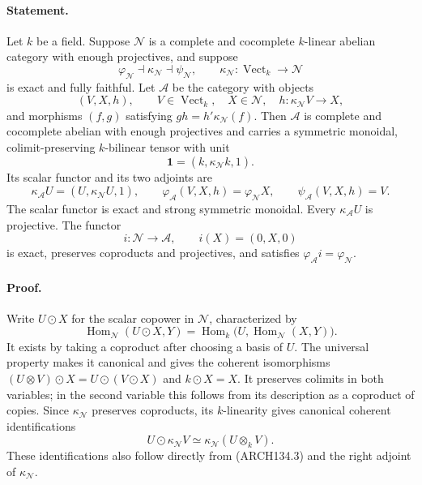 \paragraph{Statement.}
Let $k$ be a field.  Suppose $\mathcal N$ is a complete and cocomplete
$k$-linear abelian category with enough projectives, and suppose
\[
 \varphi_{\mathcal N}\dashv\kappa_{\mathcal N}\dashv\psi_{\mathcal N},
 \qquad \kappa_{\mathcal N}:\operatorname{Vect}_k\longrightarrow\mathcal N
\]
is exact and fully faithful.  Let $\mathcal A$ be the category with objects
\[
       (V,X,h),\qquad V\in\operatorname{Vect}_k,
       \quad X\in\mathcal N,\quad h:\kappa_{\mathcal N}V\longrightarrow X,
\]
and morphisms $(f,g)$ satisfying $gh=h'\kappa_{\mathcal N}(f)$.
Then $\mathcal A$ is complete and cocomplete abelian with enough
projectives and carries a symmetric monoidal, colimit-preserving
$k$-bilinear tensor with unit
\[
                  \mathbf1=(k,\kappa_{\mathcal N}k,1).
\]
Its scalar functor and its two adjoints are
\[
 \kappa_{\mathcal A}U=(U,\kappa_{\mathcal N}U,1),\qquad
 \varphi_{\mathcal A}(V,X,h)=\varphi_{\mathcal N}X,\qquad
 \psi_{\mathcal A}(V,X,h)=V.
 \tag{ARCH134.1}
\]
The scalar functor is exact and strong symmetric monoidal.  Every
$\kappa_{\mathcal A}U$ is projective.  The functor
\[
       i:\mathcal N\longrightarrow\mathcal A,
                    \qquad i(X)=(0,X,0)
 \tag{ARCH134.2}
\]
is exact, preserves coproducts and projectives, and satisfies
$\varphi_{\mathcal A}i=\varphi_{\mathcal N}$.

\paragraph{Proof.}
Write $U\odot X$ for the scalar copower in $\mathcal N$,
characterized by
\[
 \operatorname{Hom}_{\mathcal N}(U\odot X,Y)
 =\operatorname{Hom}_k\bigl(U,\operatorname{Hom}_{\mathcal N}(X,Y)\bigr).
 \tag{ARCH134.3}
\]
It exists by taking a coproduct after choosing a basis of $U$.
The universal property makes it canonical and gives the coherent
isomorphisms $(U\otimes V)\odot X=U\odot(V\odot X)$ and
$k\odot X=X$.  It preserves colimits in both variables; in the second
variable this follows from its description as a coproduct of copies.
Since $\kappa_{\mathcal N}$ preserves coproducts, its $k$-linearity gives
canonical coherent identifications
\[
       U\odot\kappa_{\mathcal N}V
                     \simeq\kappa_{\mathcal N}(U\otimes_k V).
 \tag{ARCH134.4}
\]
These identifications also follow directly from (ARCH134.3) and the
right adjoint of $\kappa_{\mathcal N}$.

